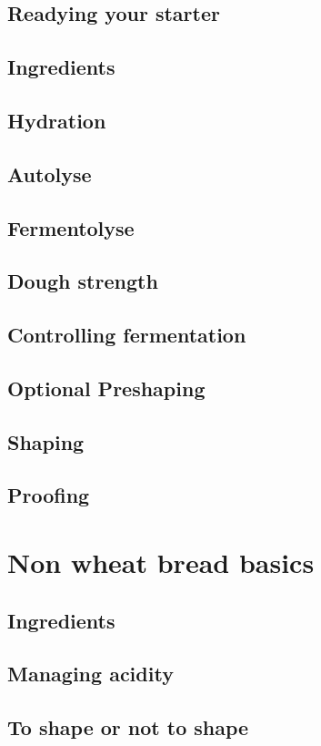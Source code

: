\documentclass[a4paper, 12pt]{book}
\begin{document}
\section{Readying your starter}
\section{Ingredients}
\section{Hydration}
\section{Autolyse}
\section{Fermentolyse}
\section{Dough strength}
\section{Controlling fermentation}
\section{Optional Preshaping}
\section{Shaping}
\section{Proofing}

\chapter{Non wheat bread basics}
\section{Ingredients}
\section{Managing acidity}
\section{To shape or not to shape}
\end{document}
